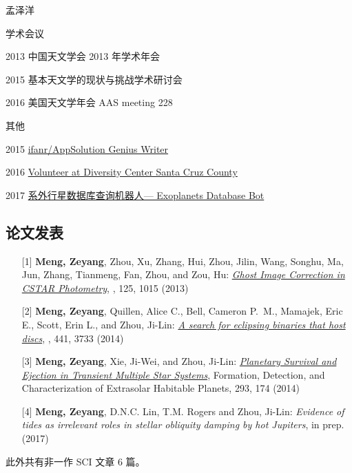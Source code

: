 \begin{resume}
\begin{cv}{\hfill 孟泽洋}
\begin{cvlist}{学术会议}
\item[2013]   中国天文学会 2013 年学术年会
\item[2015]   基本天文学的现状与挑战学术研讨会
\item[2016]   美国天文学年会 AAS meeting 228
\end{cvlist}   
\begin{cvlist}{其他}
\setlength{\itemsep}{-0.250\baselineskip plus 0.2em minus 0.2em}
\item[2015]  \href{http://www.ifanr.com/author/meldonization}{ifanr/AppSolution Genius Writer}
\item[2016] \href{http://www.diversitycenter.org/}{Volunteer at Diversity Center Santa Cruz County}
\item[2017] \href{https://telegram.me/exoplanets_bot}{系外行星数据库查询机器人--- Exoplanets Database Bot}
\end{cvlist} 
\subsection*{论文发表} 
\begin{itemize}
\item[{[1]}] \textbf{Meng, Zeyang}, Zhou, Xu, Zhang, Hui, Zhou, Jilin, Wang, Songhu, Ma, Jun, Zhang, Tianmeng, Fan, Zhou, and Zou, Hu:  \href{http://adsabs.harvard.edu/abs/2013PASP..125.1015M}{\textit{Ghost Image Correction in CSTAR Photometry}}, \pasp, 125, 1015 (2013) 
\item[{[2]}] \textbf{Meng, Zeyang}, Quillen, Alice C., Bell, Cameron P.~M., Mamajek, Eric E., Scott, Erin L., and Zhou, Ji-Lin:  \href{http://adsabs.harvard.edu/abs/2014MNRAS.441.3733M}{\textit{A search for eclipsing binaries that host discs}}, \mnras, 441, 3733 (2014)  
\item[{[3]}] \textbf{Meng, Zeyang}, Xie, Ji-Wei, and Zhou, Ji-Lin:  \href{http://adsabs.harvard.edu/abs/2014IAUS..293..174M}{\textit{Planetary Survival and Ejection in Transient Multiple Star Systems}}, Formation, Detection, and Characterization of Extrasolar Habitable Planets, 293, 174 (2014) 
\item[{[4]}] \textbf{Meng, Zeyang}, D.N.C. Lin, T.M. Rogers and Zhou, Ji-Lin:  \textit{Evidence of tides as irrelevant roles in stellar obliquity damping by hot Jupiters}, in prep.  (2017)
\end{itemize}
此外共有非一作 SCI 文章 6 篇。\\ 
\vfill
{}
\end{cv}

\end{resume}